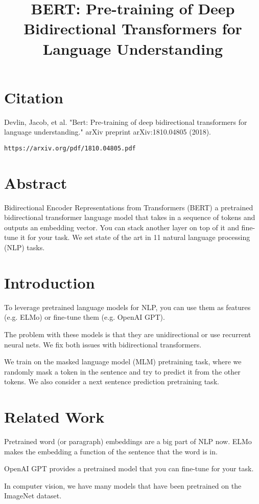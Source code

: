 \documentclass[a4paper]{article}
\title{BERT: Pre-training of Deep Bidirectional Transformers for Language Understanding}
\date{}
\begin{document}
\maketitle

\section{Citation}
Devlin, Jacob, et al. "Bert: Pre-training of deep bidirectional transformers for language understanding." arXiv preprint arXiv:1810.04805 (2018).

\begin{verbatim}
https://arxiv.org/pdf/1810.04805.pdf
\end{verbatim}

\section{Abstract}
Bidirectional Encoder Representations from Transformers (BERT) a pretrained
bidirectional transformer language model that takes in a sequence of tokens and
outputs an embedding vector. You can stack another layer on top of it and
fine-tune it for your task. We set state of the art in 11 natural language
processing (NLP) tasks.

\section{Introduction}
To leverage pretrained language models for NLP, you can use them as features
(e.g. ELMo) or fine-tune them (e.g. OpenAI GPT).

The problem with these models is that they are unidirectional or use recurrent
neural nets. We fix both issues with bidirectional transformers.

We train on the masked language model (MLM) pretraining task, where we randomly
mask a token in the sentence and try to predict it from the other tokens. We also
consider a next sentence prediction pretraining task.

\section{Related Work}
Pretrained word (or paragraph) embeddings are a big part of NLP now. ELMo
makes the embedding a function of the sentence that the word is in.

OpenAI GPT provides a pretrained model that you can fine-tune for your task.

In computer vision, we have many models that have been pretrained on the
ImageNet dataset.
\end{document}
